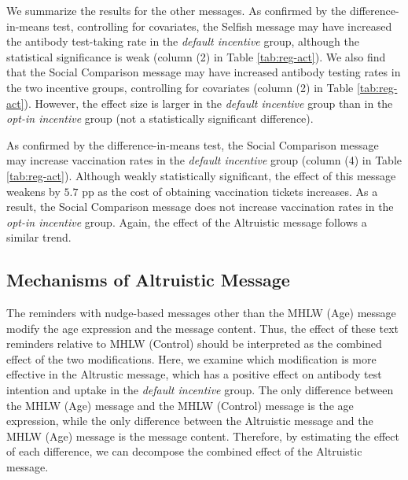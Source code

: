 \documentclass[
]{article}
\begin{document}
We summarize the results for the other messages. As confirmed by the difference-in-means test, controlling for covariates, the Selfish message may have increased the antibody test-taking rate in the \emph{default incentive} group, although the statistical significance is weak (column (2) in Table \ref{tab:reg-act}). We also find that the Social Comparison message may have increased antibody testing rates in the two incentive groups, controlling for covariates (column (2) in Table \ref{tab:reg-act}). However, the effect size is larger in the \emph{default incentive} group than in the \emph{opt-in incentive} group (not a statistically significant difference).

As confirmed by the difference-in-means test, the Social Comparison message may increase vaccination rates in the \emph{default incentive} group (column (4) in Table \ref{tab:reg-act}). Although weakly statistically significant, the effect of this message weakens by \(5.7\) pp as the cost of obtaining vaccination tickets increases. As a result, the Social Comparison message does not increase vaccination rates in the \emph{opt-in incentive} group. Again, the effect of the Altruistic message follows a similar trend.

\hypertarget{mechanisms-of-altruistic-message}{%
\subsection{Mechanisms of Altruistic Message}\label{mechanisms-of-altruistic-message}}

The reminders with nudge-based messages other than the MHLW (Age) message modify the age expression and the message content. Thus, the effect of these text reminders relative to MHLW (Control) should be interpreted as the combined effect of the two modifications. Here, we examine which modification is more effective in the Altrustic message, which has a positive effect on antibody test intention and uptake in the \emph{default incentive} group. The only difference between the MHLW (Age) message and the MHLW (Control) message is the age expression, while the only difference between the Altruistic message and the MHLW (Age) message is the message content. Therefore, by estimating the effect of each difference, we can decompose the combined effect of the Altruistic message.
\end{document}
